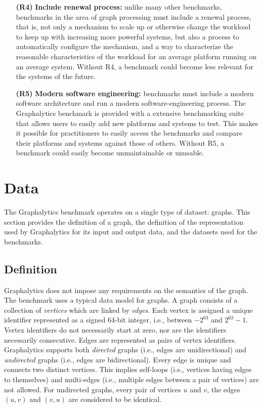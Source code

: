 \begin{itemize}
\item[\textbf{(R4)}] \textbf{Include renewal process:} unlike many other benchmarks, benchmarks in the area of graph processing must include a renewal process, that is, not only a mechanism to scale up or otherwise change the workload to keep up with increasing more powerful systems, but also a process to automatically configure the mechanism, and a way to characterize the reasonable characteristics of the workload for an average platform running on an average system. Without R4, a benchmark could become less relevant for the systems of the future.

\item[\textbf{(R5)}] \textbf{Modern software engineering:} benchmarks must include a modern software architecture and run a modern software-engineering process. The Graphalytics benchmark is provided with a extensive benchmarking suite that allows users to easily add new platforms and systems to test. This makes it possible for practitioners to easily access the benchmarks and compare their platforms and systems against those of others. Without R5, a benchmark could easily become unmaintainable or unusable.
\end{itemize}


\section{Data}
The Graphalytics benchmark operates on a single type of dataset: graphs. This section provides the definition of a graph, the definition of the representation used by Graphalytics for its input and output data, and the datasets used for the benchmarks.

\subsection{Definition}
Graphalytics does not impose any requirements on the semantics of the graph. The benchmark uses a typical data model for graphs. A graph consists of a collection of \emph{vertices} which are linked by \emph{edges}.  Each vertex is assigned a unique identifier represented as a signed 64-bit integer, i.e., between $-2^{63}$ and $2^{63}-1$. Vertex identifiers do not necessarily start at zero, nor are the identifiers necessarily consecutive. Edges are represented as pairs of vertex identifiers. Graphalytics supports both \emph{directed} graphs (i.e., edges are unidirectional) and \emph{undirected} graphs (i.e., edges are bidirectional). Every edge is unique and connects two distinct vertices. This implies self-loops (i.e., vertices having edges to themselves) and multi-edges (i.e., multiple edges between a pair of vertices) are not allowed. For undirected graphs, every pair of vertices $u$ and $v$, the edges $(u,v)$ and $(v,u)$ are considered to be identical.

